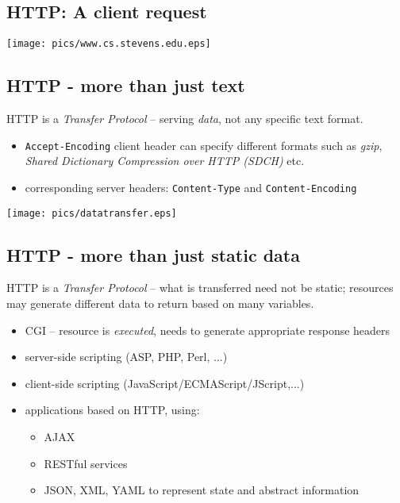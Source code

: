\documentclass[xga]{xdvislides}
\begin{document}
\subsection{HTTP: A client request}
\begin{center}
	\texttt{[image: pics/www.cs.stevens.edu.eps]}
\end{center}


\subsection{HTTP - more than just text}
HTTP is a {\em Transfer Protocol} -- serving {\em data}, not any specific
text format.

\begin{itemize}
	\item {\tt Accept-Encoding} client header can specify different formats
		such as {\em gzip}, {\em Shared Dictionary Compression over HTTP (SDCH)} etc.
	\item corresponding server headers: {\tt Content-Type} and
		{\tt Content-Encoding}
\end{itemize}
\begin{center}
	\texttt{[image: pics/datatransfer.eps]}
\end{center}

\subsection{HTTP - more than just static data}
HTTP is a {\em Transfer Protocol} -- what is transferred need not be
static; resources may generate different data to return based on many
variables.

\begin{itemize}
	\item CGI -- resource is {\em executed}, needs to generate
		appropriate response headers
	\item server-side scripting (ASP, PHP, Perl, ...)
	\item client-side scripting (JavaScript/ECMAScript/JScript,...)
	\item applications based on HTTP, using:
		\begin{itemize}
			\item AJAX
			\item RESTful services
			\item JSON, XML, YAML to represent state and
				abstract information
		\end{itemize}
\end{itemize}
\end{document}
